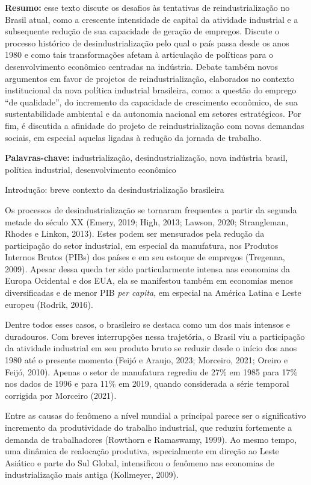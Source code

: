 \textbf{Resumo:} esse texto discute os desafios às tentativas de
reindustrialização no Brasil atual, como a crescente intensidade de
capital da atividade industrial e a subsequente redução de sua
capacidade de geração de empregos. Discute o processo histórico de
desindustrialização pelo qual o país passa desde os anos 1980 e como
tais transformações afetam à articulação de políticas para o
desenvolvimento econômico centradas na indústria. Debate também novos
argumentos em favor de projetos de reindustrialização, elaborados no
contexto institucional da nova política industrial brasileira, como: a
questão do emprego ``de qualidade'', do incremento da capacidade de
crescimento econômico, de sua sustentabilidade ambiental e da autonomia
nacional em setores estratégicos. Por fim, é discutida a afinidade do
projeto de reindustrialização com novas demandas sociais, em especial
aquelas ligadas à redução da jornada de trabalho.

\textbf{Palavras-chave:} industrialização, desindustrialização, nova
indústria brasil, política industrial, desenvolvimento econômico

Introdução: breve contexto da desindustrialização brasileira

Os processos de desindustrialização se tornaram frequentes a partir da
segunda metade do século XX (Emery, 2019; High, 2013; Lawson, 2020;
Strangleman, Rhodes e Linkon, 2013). Estes podem ser mensurados pela
redução da participação do setor industrial, em especial da manufatura,
nos Produtos Internos Brutos (PIBs) dos países e em seu estoque de
empregos (Tregenna, 2009). Apesar dessa queda ter sido particularmente
intensa nas economias da Europa Ocidental e dos EUA, ela se manifestou
também em economias menos diversificadas e de menor PIB \emph{per
capita}, em especial na América Latina e Leste europeu (Rodrik, 2016).

Dentre todos esses casos, o brasileiro se destaca como um dos mais
intensos e duradouros. Com breves interrupções nessa trajetória, o
Brasil viu a participação da atividade industrial em seu produto bruto
se reduzir desde o início dos anos 1980 até o presente momento (Feijó e
Araujo, 2023; Morceiro, 2021; Oreiro e Feijó, 2010). Apenas o setor de
manufatura regrediu de 27\% em 1985 para 17\% nos dados de 1996 e para
11\% em 2019, quando considerada a série temporal corrigida por Morceiro
(2021).

Entre as causas do fenômeno a nível mundial a principal parece ser o
significativo incremento da produtividade do trabalho industrial, que
reduziu fortemente a demanda de trabalhadores (Rowthorn e Ramaswamy,
1999). Ao mesmo tempo, uma dinâmica de realocação produtiva,
especialmente em direção ao Leste Asiático e parte do Sul Global,
intensificou o fenômeno nas economias de industrialização mais antiga
(Kollmeyer, 2009).

